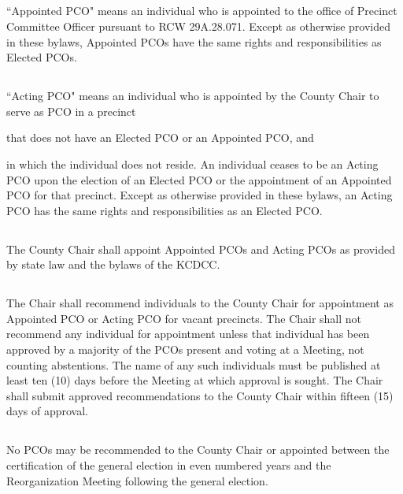 \subsection{}
``Appointed PCO" means an individual who is appointed to the office of Precinct Committee Officer pursuant to RCW 29A.28.071. Except as otherwise provided in these bylaws, Appointed PCOs have the same rights and responsibilities as Elected PCOs.

\subsection{} \label{acting-pco}
``Acting PCO" means an individual who is appointed by the County Chair to serve as PCO in a precinct
\begin{inlinealphalist}
    \item that does not have an Elected PCO or an Appointed PCO, and
    \item in which the individual does not reside. An individual ceases to be an Acting PCO upon the election of an Elected PCO or the appointment of an Appointed PCO for that precinct. Except as otherwise provided in these bylaws, an Acting PCO has the same rights and responsibilities as an Elected PCO.
\end{inlinealphalist}

\subsection{}
The County Chair shall appoint Appointed PCOs and Acting PCOs as provided by state law and the bylaws of the KCDCC.

\subsection{}
The Chair shall recommend individuals to the County Chair for appointment as Appointed PCO or Acting PCO for vacant precincts. The Chair shall not recommend any individual for appointment unless that individual has been approved by a majority of the PCOs present and voting at a Meeting, not counting abstentions. The name of any such individuals must be published at least ten (10) days before the Meeting at which approval is sought. The Chair shall submit approved recommendations to the County Chair within fifteen (15) days of approval.

\subsection{}
No PCOs may be recommended to the County Chair or appointed between the certification of the general election in even numbered years and the Reorganization Meeting following the general election.

